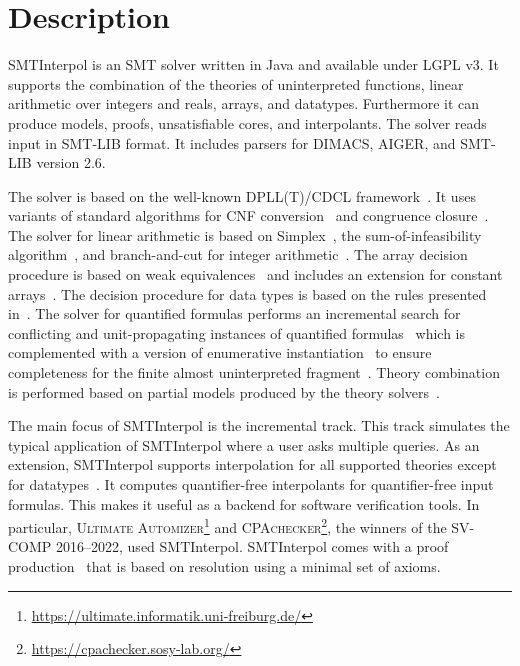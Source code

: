 \documentclass[a4paper]{easychair}
\title{\SI with resolution proofs\\{\large Version \version}}
\author{Jochen Hoenicke\inst{1} \and Tanja Schindler\inst{2}}
\institute{
  Certora, \email{jochen@certora.com} \and
  University of Li\`{e}ge, \email{tanja.schindler@uliege.be}
}
\newcommand\SI{SMTInterpol\xspace}
\begin{document}
\maketitle
\section*{Description}
\SI is an SMT solver written in Java and available under LGPL v3.
It supports the combination of the theories of uninterpreted functions, linear arithmetic over integers and reals, arrays, and datatypes.
Furthermore it can produce models, proofs, unsatisfiable cores, and interpolants.
The solver reads input in SMT-LIB format.
It includes parsers for DIMACS, AIGER, and SMT-LIB version 2.6.

The solver is based on the well-known DPLL(T)/CDCL framework~\cite{DBLP:conf/cav/GanzingerHNOT04}.
It uses variants of standard algorithms for CNF conversion~\cite{DBLP:journals/jsc/PlaistedG86} and congruence closure~\cite{DBLP:conf/rta/NieuwenhuisO05}.
The solver for linear arithmetic is based on Simplex~\cite{DBLP:conf/cav/DutertreM06}, the sum-of-infeasibility algorithm~\cite{DBLP:conf/fmcad/KingBD13}, and branch-and-cut for integer arithmetic~\cite{DBLP:conf/cav/ChristH15,DBLP:conf/cav/DilligDA09}.
The array decision procedure is based on weak equivalences~\cite{DBLP:conf/frocos/ChristH15} and includes an extension for constant arrays~\cite{DBLP:conf/vmcai/HoenickeS19}.
The decision procedure for data types is based on the rules presented in~\cite{DBLP:journals/jsat/BarrettST07}.
The solver for quantified formulas performs an incremental search for conflicting and unit-propagating instances of quantified formulas~\cite{DBLP:conf/vmcai/HoenickeS21} which is complemented with a version of enumerative instantiation~\cite{DBLP:conf/tacas/ReynoldsBF18} to ensure completeness for the finite almost uninterpreted fragment~\cite{DBLP:conf/cav/GeM09}.
Theory combination is performed based on partial models produced by the theory solvers~\cite{DBLP:journals/entcs/MouraB08}.

The main focus of \SI is the incremental track.
This track simulates the typical application of \SI where a user asks multiple queries.
As an extension, \SI supports interpolation for all supported theories except for datatypes~\cite{DBLP:journals/jar/ChristH16,DBLP:conf/cade/HoenickeS18,DBLP:conf/vmcai/HoenickeS19,DBLP:conf/smt/HenkelHS21}.  It computes quantifier-free interpolants for quantifier-free input formulas.
This makes it useful as a backend for software verification tools.
In particular, \textsc{Ultimate Automizer}\footnote{\url{https://ultimate.informatik.uni-freiburg.de/}} and \textsc{CPAchecker}\footnote{\url{https://cpachecker.sosy-lab.org/}}, the winners of the SV-COMP 2016--2022, used \SI.
\SI comes with a proof production~\cite{DBLP:conf/smt/HoenickeS22} that is based on resolution using a minimal set of axioms.
\end{document}
